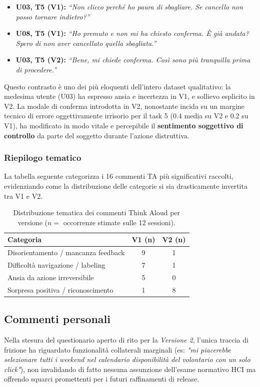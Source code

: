 \begin{itemize}
    \item \textbf{U03, T5 (V1):} \textit{``Non clicco perché ho paura di sbagliare. Se cancello non posso tornare indietro?''}
    \item \textbf{U08, T5 (V1):} \textit{``Ho premuto e non mi ha chiesto conferma. È già andata? Spero di non aver cancellato quella sbagliata.''}
    \item \textbf{U03, T5 (V2):} \textit{``Bene, mi chiede conferma. Così sono più tranquilla prima di procedere.''}
\end{itemize}
Questo contrasto è uno dei più eloquenti dell'intero dataset qualitativo: la medesima utente (U03) ha espresso ansia e incertezza in V1, e sollievo esplicito in V2. La modale di conferma introdotta in V2, nonostante incida su un margine tecnico di errore oggettivamente irrisorio per il task 5 (0.4 media su V2 e 0.2 su V1), ha modificato in modo vitale e percepibile il \textbf{sentimento soggettivo di controllo} da parte del soggetto durante l'azione distruttiva.

\subsubsection{Riepilogo tematico}
La tabella seguente categorizza i 16 commenti TA più significativi raccolti, evidenziando come la distribuzione delle categorie si sia drasticamente invertita tra V1 e V2.

\begin{table}[H]
\centering
\renewcommand{\arraystretch}{1.3}
\begin{tabular}{|l|c|c|}
\hline
\textbf{Categoria} & \textbf{V1 (n)} & \textbf{V2 (n)} \\
\hline
Disorientamento / mancanza feedback & 9 & 1 \\
Difficoltà navigazione / labeling    & 7 & 1 \\
Ansia da azione irreversibile        & 5 & 0 \\
Sorpresa positiva / riconoscimento   & 1 & 8 \\
\hline
\end{tabular}
\caption{Distribuzione tematica dei commenti Think Aloud per versione ($n=$ occorrenze stimate sulle 12 sessioni).}
\label{tab:ta_summary}
\end{table}

\subsection{Commenti personali}
Nella stesura del questionario aperto di rito per la \textit{Versione 2}, l'unica traccia di frizione ha riguardato funzionalità collaterali marginali (es: \textit{"mi piacerebbe selezionare tutti i weekend nel calendario disponibilità del volontario con un solo click"}), non invalidando di fatto nessuna assunzione dell'esame normativo HCI ma offrendo squarci promettenti per i futuri raffinamenti di release.

